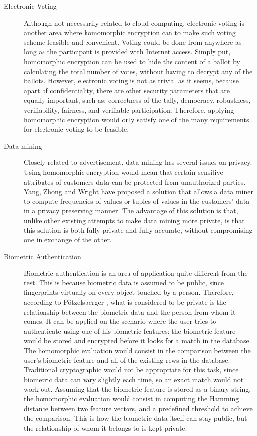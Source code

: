 \begin{description}
\item[Electronic Voting] Although not necessarily related to cloud computing, electronic voting is another area where homomorphic encryption can to make such voting scheme feasible and convenient. Voting could be done from anywhere as long as the participant is provided with Internet access. Simply put, homomorphic encryption can be used to hide the content of a ballot by calculating the total number of votes, without having to decrypt any of the ballots. However, electronic voting is not as trivial as it seems, because apart of confidentiality, there are other security parameters that are equally important, such as: correctness of the tally, democracy, robustness, verifiability, fairness, and verifiable participation. Therefore, applying homomorphic encryption would only satisfy one of the many requirements for electronic voting to be feasible.
\item[Data mining] Closely related to advertisement, data mining has several issues on privacy. Using homomorphic encryption would mean that certain sensitive attributes of customers data can be protected from unauthorized parties. Yang, Zhong and Wright \cite{YangZhongWright} have proposed a solution that allows a data miner to compute frequencies of values or tuples of values in the customers' data in a privacy preserving manner. The advantage of this solution is that, unlike other existing attempts to make data mining more private, is that this solution is both fully private and fully accurate, without compromising one in exchange of the other.
\item[Biometric Authentication] Biometric authentication is an area of application quite different from the rest. This is because biometric data is assumed to be public, since fingerprints virtually on every object touched by a person. Therefore, according to P{\"o}tzelsberger \cite{potzelsberger2013kv}, what is considered to be private is the relationship between the biometric data and the person from whom it comes. It can be applied on the scenario where the user tries to authenticate using one of his biometric features: the biometric feature would be stored and encrypted before it looks for a match in the database. The homomorphic evaluation would consist in the comparison between the user's biometric feature and all of the existing rows in the database. Traditional cryptographic would not be appropriate for this task, since biometric data can vary slightly each time, so an exact match would not work out. Assuming that the biometric feature is stored as a binary string, the homomorphic evaluation would consist in computing the Hamming distance between two feature vectors, and a predefined threshold to achieve the comparison. This is how the biometric data itself can stay public, but the relationship of whom it belongs to is kept private.
\end{description}

